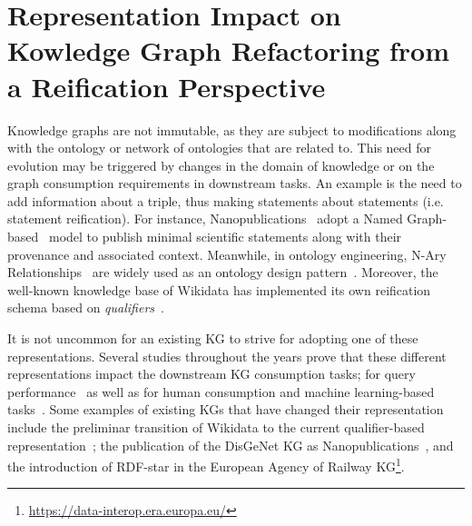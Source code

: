 

\chapter{Representation Impact on Kowledge Graph Refactoring from a Reification Perspective}
\label{chapter:evolution}

Knowledge graphs are not immutable, as they are subject to modifications along with the ontology or network of ontologies that are related to. This need for evolution may be triggered by changes in the domain of knowledge or on the graph consumption requirements in downstream tasks. 
An example is the need to add information about a triple, thus making statements about statements (i.e. statement reification).
For instance, Nanopublications~\parencite{groth2010nanopubs} adopt a Named Graph-based~\parencite{carroll2005namedgraphs} model to publish minimal scientific statements along with their provenance and associated context. Meanwhile, in ontology engineering, N-Ary Relationships~\parencite{naryw3c2006} are widely used as an ontology design pattern~\parencite{gangemi2013multi}. Moreover, the well-known knowledge base of Wikidata has implemented its own reification schema based on \textit{qualifiers}~\parencite{erxleben2014introducing}. 

It is not uncommon for an existing KG to strive for adopting one of these representations. Several studies throughout the years prove that these different representations impact the downstream KG consumption tasks; for query performance~\parencite{das2014tale,nguyen2014don,alocci2015property,hernandez2015reifying,frey2019evaluation,orlandi2021benchmarking} as well as for human consumption and machine learning-based tasks~\parencite{iglesias2023kgconsumption}. Some examples of existing KGs that have changed their representation include the preliminar transition of Wikidata to the current qualifier-based representation~\parencite{erxleben2014introducing}; the publication of the DisGeNet KG as Nanopublications~\parencite{queralt2016disgenet}, and the introduction of RDF-star in the European Agency of Railway  KG\footnote{\url{https://data-interop.era.europa.eu/}}.

